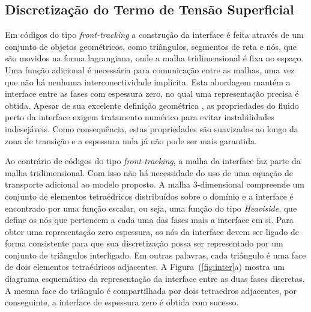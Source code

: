 \documentclass[a4paper,portuges,12pt]{article}
\begin{document}
\subsection{Discretização do Termo de Tensão Superficial}

Em códigos do tipo \textit{front-tracking} a construção da interface é feita
através de um conjunto de objetos geométricos, como triângulos,
segmentos de reta e nós, que são movidos na forma lagrangiana, onde a
malha tridimensional é fixa no espaço. Uma função adicional é necessária
para comunicação entre as malhas, uma vez que não há nenhuma
interconectividade implícita. Esta abordagem mantém a interface entre as
fases com espessura zero, no qual uma representação precisa é obtida.
Apesar de sua excelente definição geométrica , as propriedades do fluido
perto da interface exigem tratamento numérico para evitar instabilidades
indesejáveis. Como consequência, estas propriedades são suavizados ao
longo da zona de transição e a espessura nula já não pode ser mais
garantida.

Ao contrário de códigos do tipo \textit{front-tracking}, a malha da interface
faz parte da malha tridimensional. Com isso não há necessidade do uso de
uma equação de transporte adicional ao modelo proposto. A malha
3-dimensional compreende um conjunto de elementos tetraédricos
distribuídos sobre o domínio e a interface é encontrado por uma função
escalar, ou seja, uma função do tipo \textit{Heaviside}, que define os nós que
pertencem a cada uma das fases mais a interface em si. Para obter uma
representação zero espessura, os nós da interface devem ser ligado de
forma consistente para que sua discretização possa ser representado por
um conjunto de triângulos interligado. Em outras palavras, cada
triângulo é uma face de dois elementos tetraédricos adjacentes. A
Figura~(\ref{fig:inter}a) mostra um diagrama esquemático da
representação da interface entre as duas fases discretas. A mesma face
do triângulo é compartilhada por dois tetraedros adjacentes, por
conseguinte, a interface de espessura zero é obtida com sucesso.
\end{document}
